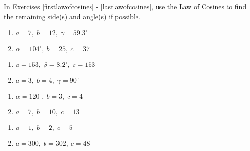 In Exercises \ref{firstlawofcosines} - \ref{lastlawofcosines}, use the Law of Cosines to find the remaining side(s) and angle(s) if possible.

\begin{multicols}{2}

\begin{enumerate}

\item $a = 7, \; b = 12, \; \gamma = 59.3^{\circ}$ \label{firstlawofcosines}
\item $\alpha = 104^{\circ}, \; b = 25, \; c  = 37$

\setcounter{HW}{\value{enumi}}

\end{enumerate}

\end{multicols}

\begin{multicols}{2} 

\begin{enumerate}

\setcounter{enumi}{\value{HW}}

\item $a = 153, \; \beta = 8.2^{\circ}, \; c = 153$
\item $a = 3, \; b = 4, \; \gamma = 90^{\circ}$

\setcounter{HW}{\value{enumi}}

\end{enumerate}

\end{multicols}

\begin{multicols}{2} 

\begin{enumerate}

\setcounter{enumi}{\value{HW}}

\item $\alpha = 120^{\circ}, \; b = 3, \; c = 4$
\item $a = 7, \; b = 10, \; c = 13$ \label{firstherons}

\setcounter{HW}{\value{enumi}}

\end{enumerate}

\end{multicols}

\begin{multicols}{2} 

\begin{enumerate}

\setcounter{enumi}{\value{HW}}

\item $a = 1, \; b = 2, \; c = 5$
\item $a = 300, \; b = 302, \; c = 48$ \label{secondherons}

\setcounter{HW}{\value{enumi}}

\end{enumerate}

\end{multicols}

